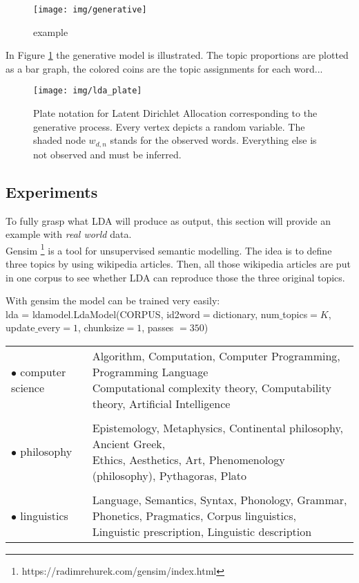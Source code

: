 \documentclass[a4paper,ngerman]{atseminar}
\begin{document}
\begin{figure}[H]
\centering
\texttt{[image: img/generative]}
\caption{example}
  \label{fig:generative}
\end{figure}

In Figure \ref{fig:generative} the generative model is illustrated. The topic proportions are plotted
as a bar graph, the colored coins are the topic assignments for each word...



\begin{figure}[H]
\centering
\texttt{[image: img/lda\_plate]}
 \caption{Plate notation for Latent Dirichlet Allocation corresponding to the generative process. Every vertex depicts a random variable.
 The shaded node $w_{d,n}$ stands for the observed words. Everything else is not observed and must be inferred.}
  \label{fig:lda_plate}
\end{figure}

\subsection{Experiments}
To fully grasp what LDA will produce as output, this section will provide an example with 
\textit{real world} data. \\
Gensim \footnote{ https://radimrehurek.com/gensim/index.html } is a tool for unsupervised semantic modelling.
The idea is to define three topics by using wikipedia articles. Then, all those wikipedia articles are
put in one corpus to see whether LDA can reproduce those the three original topics.

With gensim the model can be trained very easily: \\
lda = ldamodel.LdaModel(CORPUS, id2word$=$dictionary, num$\_$topics$=K$, update$\_$every$=1$, chunksize$=1$, passes $=350$)

\vspace{1.3cm}

\begin{tabular}{l l}
$\bullet$ computer science & \parbox[t]{10cm}{Algorithm, Computation, Computer Programming,  Programming Language\\ Computational complexity theory, Computability theory, Artificial Intelligence}\\  
\\
$\bullet$ philosophy & \parbox[t]{10cm}{Epistemology, Metaphysics, Continental philosophy, Ancient Greek,\\ Ethics, Aesthetics, Art, Phenomenology (philosophy), Pythagoras, Plato} \\
\\
$\bullet$ linguistics &  \parbox[t]{10cm}{Language, Semantics, Syntax, Phonology, Grammar,
               Phonetics, Pragmatics,  Corpus linguistics,\\
               Linguistic prescription, Linguistic description}
\end{tabular}
\end{document}

